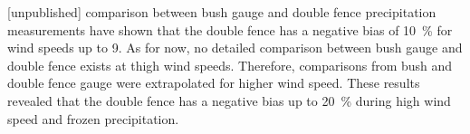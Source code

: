 \citet{wolff_wmo_2018} [unpublished] comparison between bush gauge and double fence precipitation measurements have shown that the double fence has a negative bias of \SI{10}{\percent} for wind speeds up to \SI{9}{\mPs}. %
As for now, no detailed comparison between bush gauge and double fence exists at thigh wind speeds. Therefore, comparisons from bush and double fence gauge were extrapolated for higher wind speed. 
These results revealed that the double fence has a negative bias up to \SI{20}{\percent} during high wind speed and frozen precipitation. 

